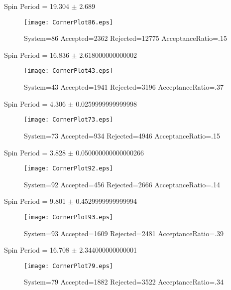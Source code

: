 \documentclass[10pt]{article}
\begin{document}
\newpage
\begin{center}
        Spin Period = 19.304 $\pm$ 2.689
        \end{center}
\begin{figure}[H] 
        \texttt{[image: CornerPlot86.eps]}
        \caption{System=86 Accepted=2362 Rejected=12775 AcceptanceRatio=.15}
        \label{S86}
        \centering
        \end{figure}
\newpage
\begin{center}
        Spin Period = 16.836 $\pm$ 2.618000000000002
        \end{center}
\begin{figure}[H] 
        \texttt{[image: CornerPlot43.eps]}
        \caption{System=43 Accepted=1941 Rejected=3196 AcceptanceRatio=.37}
        \label{S43}
        \centering
        \end{figure}
\newpage
\begin{center}
        Spin Period = 4.306 $\pm$ 0.0259999999999998
        \end{center}
\begin{figure}[H] 
        \texttt{[image: CornerPlot73.eps]}
        \caption{System=73 Accepted=934 Rejected=4946 AcceptanceRatio=.15}
        \label{S73}
        \centering
        \end{figure}
\newpage
\begin{center}
        Spin Period = 3.828 $\pm$ 0.050000000000000266
        \end{center}
\begin{figure}[H] 
        \texttt{[image: CornerPlot92.eps]}
        \caption{System=92 Accepted=456 Rejected=2666 AcceptanceRatio=.14}
        \label{S92}
        \centering
        \end{figure}
\newpage
\begin{center}
        Spin Period = 9.801 $\pm$ 0.4529999999999994
        \end{center}
\begin{figure}[H] 
        \texttt{[image: CornerPlot93.eps]}
        \caption{System=93 Accepted=1609 Rejected=2481 AcceptanceRatio=.39}
        \label{S93}
        \centering
        \end{figure}
\newpage
\begin{center}
        Spin Period = 16.708 $\pm$ 2.344000000000001
        \end{center}
\begin{figure}[H] 
        \texttt{[image: CornerPlot79.eps]}
        \caption{System=79 Accepted=1882 Rejected=3522 AcceptanceRatio=.34}
        \label{S79}
        \centering
        \end{figure}
\end{document}
